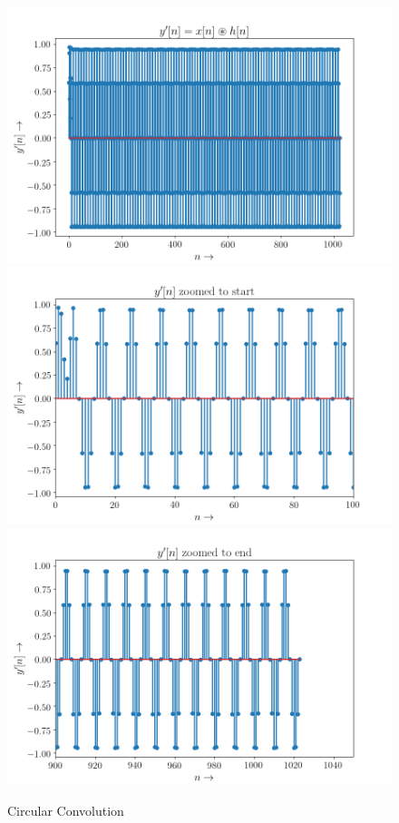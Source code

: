 \documentclass[11pt, a4paper]{article}
\begin{document}
\newpage
\begin{figure}[!tbh]
  \centering
  \includegraphics[scale=0.4]{./../Extras/a10-8.png}  %
  \includegraphics[scale=0.4]{./../Extras/a10-9.png}  %
  \includegraphics[scale=0.4]{./../Extras/a10-10.png}  %
  \caption{Circular Convolution}
\end{figure}
\newpage
\end{document}
